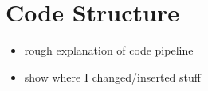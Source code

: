 \section{Code Structure}
\begin{itemize}
    \item rough explanation of code pipeline
    \item show where I changed/inserted stuff
\end{itemize}

  
